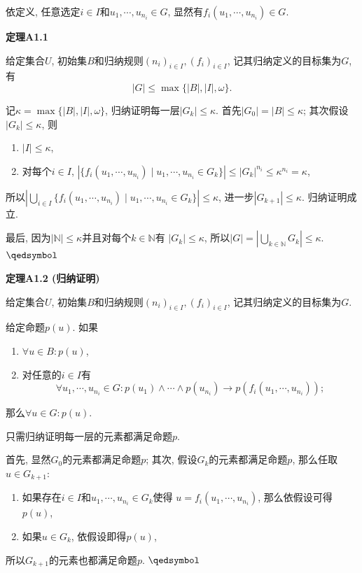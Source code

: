 \vspace{10pt}

依定义, 任意选定$i\in I$和$u_1,\cdots,u_{n_i}\in G$,
显然有$f_i(u_1,\cdots,u_{n_i})\in G$.

\vspace{10pt}

\hypertarget{sec:定理A1.1}{}
\noindent\textbf{定理A1.1}

给定集合$U$, 初始集$B$和归纳规则$(n_i)_{i\in I},(f_i)_{i\in I}$,
记其归纳定义的目标集为$G$, 有
\[
    |G|\leqslant\max\{|B|,|I|,\omega\}.
\]


记$\kappa=\max\{|B|,|I|,\omega\}$, 归纳证明每一层$|G_k|\leqslant\kappa$.
首先$|G_0|=|B|\leqslant\kappa$; 其次假设$|G_k|\leqslant\kappa$, 则
\begin{enumerate}
    \item $|I|\leqslant\kappa$,
    \item 对每个$i\in I$, $|\{f_i(u_1,\cdots,u_{n_i})\mid
    u_1,\cdots,u_{n_i}\in G_k\}|\leqslant|G_k|^{n_i}\leqslant\kappa^{n_i}=\kappa$,
\end{enumerate}
所以$\displaystyle\left|\bigcup_{i\in I}\{f_i(u_1,\cdots,u_{n_i})\mid
u_1,\cdots,u_{n_i}\in G_k\}\right|\leqslant\kappa$,
进一步$|G_{k+1}|\leqslant\kappa$. 归纳证明成立.

最后, 因为$|\mathbb{N}|\leqslant\kappa$并且对每个$k\in\mathbb{N}$有
$|G_k|\leqslant\kappa$, 所以$\displaystyle
|G|=\left|\bigcup_{k\in\mathbb{N}}G_k\right|\leqslant\kappa$. \hfill $\qedsymbol$

\vspace{10pt}

\hypertarget{sec:定理A1.2}{}
\noindent\textbf{定理A1.2 (归纳证明)}

给定集合$U$, 初始集$B$和归纳规则$(n_i)_{i\in I},(f_i)_{i\in I}$,
记其归纳定义的目标集为$G$.

给定命题$p(u)$. 如果
\begin{enumerate}
    \item $\forall u\in B:p(u)$,
    \item 对任意的$i\in I$有
    \[
        \forall u_1,\cdots,u_{n_i}\in G:p(u_1)\land\cdots\land p(u_{n_i})\to
        p(f_i(u_1,\cdots,u_{n_i}));
    \]
\end{enumerate}
那么$\forall u\in G:p(u)$.


只需归纳证明每一层的元素都满足命题$p$.

首先, 显然$G_0$的元素都满足命题$p$;
其次, 假设$G_k$的元素都满足命题$p$, 那么任取$u\in G_{k+1}$:
\begin{enumerate}
    \item 如果存在$i\in I$和$u_1,\cdots,u_{n_i}\in G_k$使得
    $u=f_i(u_1,\cdots,u_{n_i})$, 那么依假设可得$p(u)$,
    \item 如果$u\in G_k$, 依假设即得$p(u)$,
\end{enumerate}
所以$G_{k+1}$的元素也都满足命题$p$. {\hfill $\qedsymbol$}

